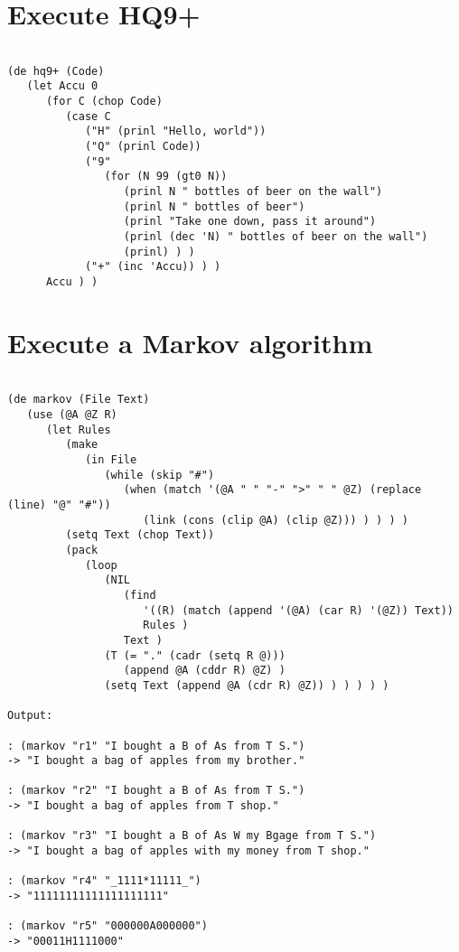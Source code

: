 \section*{Execute HQ9+}

\begin{verbatim}

(de hq9+ (Code)
   (let Accu 0
      (for C (chop Code)
         (case C
            ("H" (prinl "Hello, world"))
            ("Q" (prinl Code))
            ("9"
               (for (N 99 (gt0 N))
                  (prinl N " bottles of beer on the wall")
                  (prinl N " bottles of beer")
                  (prinl "Take one down, pass it around")
                  (prinl (dec 'N) " bottles of beer on the wall")
                  (prinl) ) )
            ("+" (inc 'Accu)) ) )
      Accu ) )

\end{verbatim}

\section*{Execute a Markov algorithm}

\begin{verbatim}

(de markov (File Text)
   (use (@A @Z R)
      (let Rules
         (make
            (in File
               (while (skip "#")
                  (when (match '(@A " " "-" ">" " " @Z) (replace (line) "@" "#"))
                     (link (cons (clip @A) (clip @Z))) ) ) ) )
         (setq Text (chop Text))
         (pack
            (loop
               (NIL
                  (find
                     '((R) (match (append '(@A) (car R) '(@Z)) Text))
                     Rules )
                  Text )
               (T (= "." (cadr (setq R @)))
                  (append @A (cddr R) @Z) )
               (setq Text (append @A (cdr R) @Z)) ) ) ) ) )

Output:

: (markov "r1" "I bought a B of As from T S.")
-> "I bought a bag of apples from my brother."

: (markov "r2" "I bought a B of As from T S.")
-> "I bought a bag of apples from T shop."

: (markov "r3" "I bought a B of As W my Bgage from T S.")
-> "I bought a bag of apples with my money from T shop."

: (markov "r4" "_1111*11111_")
-> "11111111111111111111"

: (markov "r5" "000000A000000")
-> "00011H1111000"

\end{verbatim}

